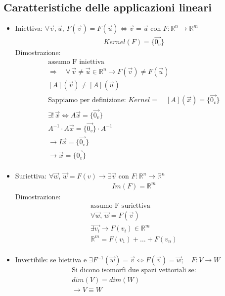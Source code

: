 \documentclass[10pt]{extarticle}
\begin{document}
\subsection{Caratteristiche delle applicazioni lineari}
\begin{itemize}
    \item Iniettiva: $\forall \vec{v},\vec{u}, \, F(\vec{v})=F(\vec{u}) \iff \vec{v}=\vec{u}$ con $F : \mathbb{R}^n \to \mathbb{R}^m$
    \begin{align*}
        Kernel(F)=\{\vec{0_v}\}
    \end{align*}
Dimostrazione:\\
\begin{align*}
    \text{assumo F iniettiva} \\
    \Rightarrow \quad \forall \, \vec{v}\neq\vec{u} \in \mathbb{R}^n \to F(\vec{v})\neq F(\vec{u}) \\
    [A](\vec{v})\neq[A](\vec{u}) \\
    \text{Sappiamo per definizione: } Kernel= \quad [A](\vec{x})=\{\vec{0_v}\} \\
    \exists! \, \vec{x} \iff A\vec{x}=\{\vec{0_v}\} \\
    A^{-1} \cdot A\vec{x}=\{\vec{0_v}\}\cdot A^{-1} \\
    \to I\vec{x}=\{\vec{0_v}\} \\
    \to \vec{x}=\{\vec{0_v}\} \\
\end{align*}
    \item Suriettiva: $\forall \vec{w}, \, \vec{w}=F(v) \to \exists \vec{v}$ con $F : \mathbb{R}^n \to \mathbb{R}^n$
    \begin{align*}
        Im(F)=\mathbb{R}^m
    \end{align*}
    Dimostrazione:
    \begin{align*}
        \text{assumo F suriettiva} \\
        \forall \vec{w}, \, \vec{w}=F(\vec{v})\\
        \exists \vec{v_i} \to F(v_i)\in\mathbb{R}^m \\
        \mathbb{R}^m=F(v_1)+\dots+F(v_n)\\
    \end{align*}
    \item Invertibile: se biettiva e $\exists F^{-1}(\vec{w})=\vec{v} \iff F(\vec{v})=\vec{w}; \quad F : V \to W$ \\
    \begin{align*}
        \text{Si dicono isomorfi due spazi vettoriali se:} \\
        dim(V)=dim(W) \\
        \to V \equiv W
    \end{align*}
\end{itemize}
\end{document}
